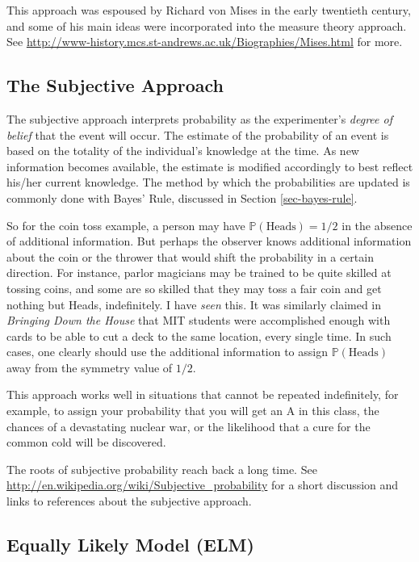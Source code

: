 \documentclass[]{book}
\numberwithin{equation}{chapter}
\numberwithin{figure}{chapter}
\theoremstyle{plain}
\theoremstyle{definition}
\theoremstyle{remark}
\theoremstyle{definition}
\theoremstyle{definition}
\theoremstyle{remark}
\begin{document}
This approach was espoused by Richard von Mises in the early twentieth
century, and some of his main ideas were incorporated into the measure
theory approach. See
\url{http://www-history.mcs.st-andrews.ac.uk/Biographies/Mises.html} for
more.

\subsection{The Subjective Approach}\label{the-subjective-approach}

The subjective approach interprets probability as the experimenter's
\emph{degree of belief} that the event will occur. The estimate of the
probability of an event is based on the totality of the individual's
knowledge at the time. As new information becomes available, the
estimate is modified accordingly to best reflect his/her current
knowledge. The method by which the probabilities are updated is commonly
done with Bayes' Rule, discussed in Section \ref{sec-bayes-rule}.

So for the coin toss example, a person may have
\(\mathbb{P}(\mbox{Heads})=1/2\) in the absence of additional
information. But perhaps the observer knows additional information about
the coin or the thrower that would shift the probability in a certain
direction. For instance, parlor magicians may be trained to be quite
skilled at tossing coins, and some are so skilled that they may toss a
fair coin and get nothing but Heads, indefinitely. I have \emph{seen}
this. It was similarly claimed in \emph{Bringing Down the House}
\autocite{Mezrich2003} that MIT students were accomplished enough with
cards to be able to cut a deck to the same location, every single time.
In such cases, one clearly should use the additional information to
assign \(\mathbb{P}(\mbox{Heads})\) away from the symmetry value of
\(1/2\).

This approach works well in situations that cannot be repeated
indefinitely, for example, to assign your probability that you will get
an A in this class, the chances of a devastating nuclear war, or the
likelihood that a cure for the common cold will be discovered.

The roots of subjective probability reach back a long time. See
\url{http://en.wikipedia.org/wiki/Subjective_probability} for a short
discussion and links to references about the subjective approach.

\subsection{Equally Likely Model (ELM)}\label{equally-likely-model-elm}
\end{document}
